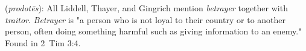\item[Betrayer,]

(\textit{prodotēs}):
All Liddell, Thayer, and Gingrich mention \emph{betrayer} together with \emph{traitor}. \emph{Betrayer} is "a person who is not loyal to their country or to another person, often doing something harmful such as giving information to an enemy."
Found in 2~Tim 3:4.
